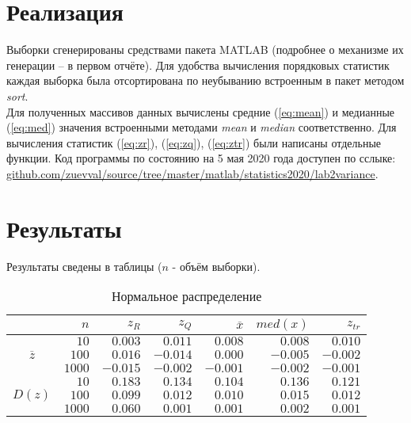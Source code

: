 \documentclass[report1.tex]{subfiles}
\begin{document}
\section{Реализация}
Выборки сгенерированы средствами пакета MATLAB (подробнее о механизме их генерации -- в первом отчёте). Для удобства вычисления порядковых статистик каждая выборка была отсортирована по неубыванию встроенным в пакет методом \emph{sort}.\\
Для полученных массивов данных вычислены средние (\ref{eq:mean}) и медианные (\ref{eq:med}) значения встроенными методами \emph{mean} и \emph{median} соответственно. Для вычисления статистик (\ref{eq:zr}), (\ref{eq:zq}), (\ref{eq:ztr}) были написаны отдельные функции. Код программы по состоянию на 5 мая 2020 года доступен по сслыке: \\ \href{https://github.com/zuevval/source/tree/master/matlab/statistics2020/lab2variance}{github.com/zuevval/source/tree/master/matlab/statistics2020/lab2variance}.

\newpage
\section{Результаты}
Результаты сведены в таблицы ($n$ - объём выборки).
\begin{table}[H]\label{table:norm}
\centering
\caption{Нормальное распределение}
\begin{tabular}{c*6r}
\toprule
{} &         
$n$  & 
\centering $z_R$ & 
\centering $z_Q$ &
\centering $\overline{x}$& 
\centering $med(x)$ &
\centering $z_{tr}$ \tabularnewline
\midrule
\multirow{3}{*}{$\overline{z}$}
& $10$    & $ 0.003$  & $ 0.011$  & $ 0.008$  & $ 0.008$  & $ 0.010$ \\
& $100$   & $ 0.016$  & $-0.014$  & $ 0.000$  & $-0.005$  & $-0.002$ \\
& $1000$  & $-0.015$  & $-0.002$  & $-0.001$  & $-0.002$  & $-0.001$ \\
\midrule
\multirow{3}{*}{$D(z)$}
& $10$    & $0.183$  & $0.134$  & $0.104$  & $0.136$  & $0.121$ \\
& $100$   & $0.099$  & $0.012$  & $0.010$  & $0.015$  & $0.012$ \\
& $1000$  & $0.060$  & $0.001$  & $0.001$  & $0.002$  & $0.001$ \\              
\bottomrule
\end{tabular}
\end{table}
\end{document}
